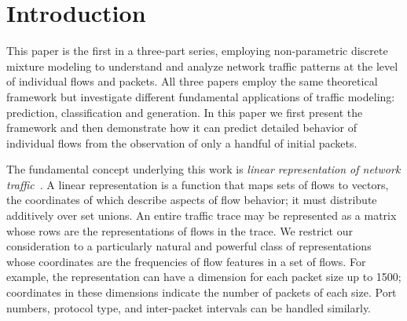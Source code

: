 \documentclass[conference]{IEEEtran}
\title{\vspace{-0.25em}\thetitle}
\author{
{\large{Stefan~Karpinski, John~R.~Gilbert, Elizabeth~M.~Belding}} \vspace{0.25em}\\
Department of Computer Science \\
University of California, Santa Barbara \vspace{0.35em}\\
\textit{\{sgk,gilbert,ebelding\}@cs.ucsb.edu}
}
\begin{document}
\maketitle

\section{Introduction}


This paper is the first in a three-part series, employing non-parametric discrete mixture modeling to understand and analyze network traffic patterns at the level of individual flows and packets.\flownote
All three papers employ the same theoretical framework but investigate different fundamental applications of traffic modeling:
prediction, classification and generation.
In this paper we first present the framework and then demonstrate how it can predict detailed behavior of individual flows from the observation of only a handful of initial packets.

The fundamental concept underlying this work is \emph{linear representation of network traffic}~\cite{Karpinski08}.
A linear representation is a function that maps sets of flows to vectors, the coordinates of which describe aspects of flow behavior;
it must distribute additively over set unions.
An entire traffic trace may be represented as a matrix whose rows are the representations of flows in the trace.
We restrict our consideration to a particularly natural and powerful class of representations whose coordinates are the frequencies of flow features in a set of flows.
For example, the representation can have a dimension for each packet size up to 1500; coordinates in these dimensions indicate the number of packets of each size.
Port numbers,  protocol type, and inter-packet intervals can be handled similarly.
\end{document}
